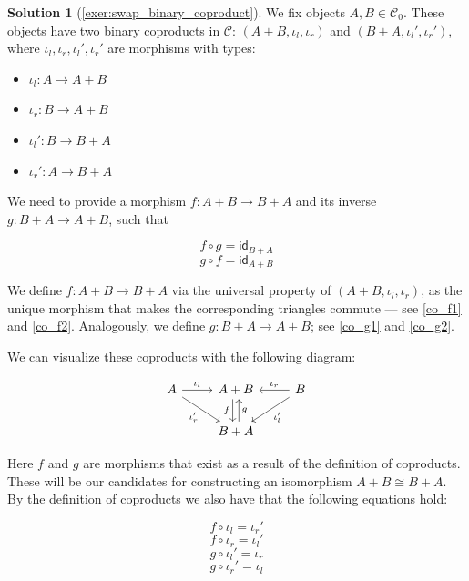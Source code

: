 \documentclass[a4paper,11pt, oneside,titlepage=false]{scrbook}
\theoremstyle{plain}
\theoremstyle{definition}
\newtheorem{solution}[thm]{Solution}
\newcommand{\cfont}[1]{\ensuremath{\mathsf{#1}}}
\newcommand{\Cat}[1]{\mathcal{#1}}
\newcommand{\CC}{\Cat{C}}
\newcommand{\Ob}[1]{{#1}_0}
\newcommand{\Id}[1][]{\cfont{id}_{#1}}
\newcommand{\inl}{\ensuremath{\iota_l}}
\newcommand{\inr}{\ensuremath{\iota_r}}
\newcommand{\co}[2]{\ensuremath{#2 \circ #1}}
\begin{document}
\begin{solution}[\cref{exer:swap_binary_coproduct}]\label{sol:swap_binary_coproduct}
We fix objects $A,B\in\Ob{\CC}$. These objects have two binary coproducts in $\CC$: $(A+B,\inl,\inr)$ and $(B+A,\inl',\inr')$, where $\inl,\inr,\inl',\inr'$ are morphisms with types:

\begin{itemize}
    \item $\inl:A \to A+B$
    \item $\inr:B \to A+B$
    \item $\inl':B \to B+A$
    \item $\inr':A \to B+A$
\end{itemize}

We need to provide a morphism $f:A+B \to B+A$ and its inverse $g:B+A \to A+B$, such that

\begin{equation}
\label{unit1}
    \co {g} {f} = \Id[B+A]
\end{equation}
\begin{equation}
\label{unit2}
    \co {f} {g} = \Id[A+B]
\end{equation}

We define $f : A + B \to B + A$ via the universal property of $(A + B, \inl, \inr)$, as the unique morphism that makes the corresponding triangles commute --- see \eqref{co_f1} and \eqref{co_f2}.
Analogously, we define $g : B + A \to A + B$; see \eqref{co_g1} and \eqref{co_g2}.

\noindent
We can visualize these coproducts with the following diagram:

\[
\begin{tikzcd}
A \arrow[r, "\inl"] \arrow[rd, "\inr'"'] & A+B \arrow[d, "f"', shift right] & B \arrow[l, "\inr"'] \arrow[ld, "\inl'"] \\
                                      & B+A \arrow[u, "g"', shift right] &
\end{tikzcd}
\]

\noindent
Here $f$ and $g$ are morphisms that exist as a result of the definition of coproducts. These will be our candidates for constructing an isomorphism $A+B\cong B+A$. By the definition of coproducts we also have that the following equations hold:

\begin{equation}
\label{co_f1}
    \co {\inl} {f} = \inr'
\end{equation}
\begin{equation}
\label{co_f2}
    \co {\inr} {f} = \inl'
\end{equation}
\begin{equation}
\label{co_g1}
    \co {\inl'} {g} = \inr
\end{equation}
\begin{equation}
\label{co_g2}
    \co {\inr'} {g} = \inl
\end{equation}


\end{solution}
\end{document}
